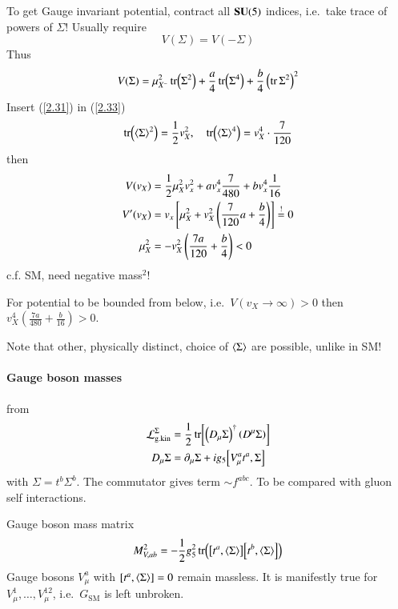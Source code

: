 To get Gauge invariant potential, contract all $\mathbf{SU}(5)$ indices, i.e.~take trace of powers of $\Sigma$! Usually require 
\begin{equation}
   V(\Sigma) =  V(-\Sigma) \label{2.32}
\end{equation}
Thus
\begin{equation}
   V(\Sigma) = \mu^2_{X^-} \tr(\Sigma^2) + \frac{a}{4} \tr(\Sigma^4) + \frac{b}{4} \left( \tr \Sigma^2 \right)^2 \label{2.33}
\end{equation}
Insert (\ref{2.31}) in (\ref{2.33})
\begin{equation*}
   \tr(\expval{\Sigma}^2) = \frac{1}{2} v_X^2, \quad \tr(\expval{\Sigma}^4) = v_X^4 \cdot \frac{7}{120}
\end{equation*}
then
\begin{align}
   V(v_X) &= \frac{1}{2} \mu_X^2 v_x^2 + a v_x^4 \frac{7}{480} + b v_x^4 \frac{1}{16} \label{2.34} \\
   V'(v_X) &= v_x \left[ \mu_X^2 + v_X^2 \left( \frac{7}{120} a + \frac{b}{4} \right)\right]  \stackrel{!}{=} 0 \notag \\
   \mu_X^2 &= - v_X^2 \left( \frac{7a}{120} + \frac{b}{4} \right) < 0
\end{align}
c.f. SM, need negative mass$^2$!

For potential to be bounded from below, i.e.~$V(v_X \rightarrow \infty) > 0$ then $v_X^4 \left( \frac{7a}{480} + \frac{b}{16} \right) > 0$.

Note that other, physically distinct, choice of $\expval{\Sigma}$ are possible, unlike in SM!

\paragraph{Gauge boson masses} from 
\begin{align}
   \lag_\text{g.kin}^\Sigma &= \frac{1}{2} \tr[ \left( D_\mu \Sigma \right)^\dagger \left( D^\mu \Sigma \right)  ] \notag \\
D_\mu \Sigma &= \partial_\mu \Sigma + i g_5 \comm{V_\mu^a t^a}{\Sigma} \label{2.36}
\end{align}
with $\Sigma = t^b \Sigma^b$. The commutator gives term $\sim f^{abc}$. To be compared with gluon self interactions.

Gauge boson mass matrix
\begin{equation}
   M_{V,ab}^2 = - \frac{1}{2} g_5^2 \tr( \comm{t^a}{\expval{\Sigma}} \comm{t^b}{\expval{\Sigma}} )    \label{2.37}
\end{equation}
Gauge bosons $V_\mu^a$ with $\comm{t^a}{\expval{\Sigma}} = 0$ remain massless. It is manifestly true for $V_\mu^1, \dots, V_\mu^{12}$, i.e.~$G_\text{SM}$ is left unbroken.

